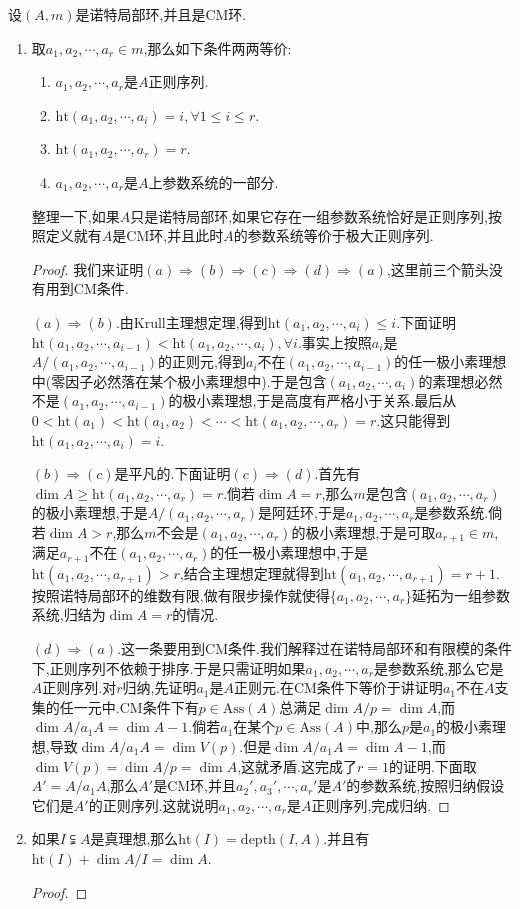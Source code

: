 设$(A,m)$是诺特局部环,并且是CM环.
\begin{enumerate}
	\item 取$a_1,a_2,\cdots,a_r\in m$,那么如下条件两两等价:
	\begin{enumerate}
		\item $a_1,a_2,\cdots,a_r$是$A$正则序列.
		\item $\mathrm{ht}(a_1,a_2,\cdots,a_i)=i,\forall 1\le i\le r$.
		\item $\mathrm{ht}(a_1,a_2,\cdots,a_r)=r$.
		\item $a_1,a_2,\cdots,a_r$是$A$上参数系统的一部分.
	\end{enumerate}

    整理一下,如果$A$只是诺特局部环,如果它存在一组参数系统恰好是正则序列,按照定义就有$A$是CM环,并且此时$A$的参数系统等价于极大正则序列.
	\begin{proof}
		
		我们来证明$(a)\Rightarrow(b)\Rightarrow(c)\Rightarrow(d)\Rightarrow(a)$,这里前三个箭头没有用到CM条件.
		
		$(a)\Rightarrow(b)$.由Krull主理想定理,得到$\mathrm{ht}(a_1,a_2,\cdots,a_i)\le i$.下面证明$\mathrm{ht}(a_1,a_2,\cdots,a_{i-1})<\mathrm{ht}(a_1,a_2,\cdots,a_i),\forall i$.事实上按照$a_i$是$A/(a_1,a_2,\cdots,a_{i-1})$的正则元,得到$a_i$不在$(a_1,a_2,\cdots,a_{i-1})$的任一极小素理想中(零因子必然落在某个极小素理想中).于是包含$(a_1,a_2,\cdots,a_i)$的素理想必然不是$(a_1,a_2,\cdots,a_{i-1})$的极小素理想,于是高度有严格小于关系.最后从$0<\mathrm{ht}(a_1)<\mathrm{ht}(a_1,a_2)<\cdots<\mathrm{ht}(a_1,a_2,\cdots,a_r)=r$.这只能得到$\mathrm{ht}(a_1,a_2,\cdots,a_i)=i$.
		
		$(b)\Rightarrow(c)$是平凡的.下面证明$(c)\Rightarrow(d)$.首先有$\dim A\ge\mathrm{ht}(a_1,a_2,\cdots,a_r)=r$.倘若$\dim A=r$,那么$m$是包含$(a_1,a_2,\cdots,a_r)$的极小素理想,于是$A/(a_1,a_2,\cdots,a_r)$是阿廷环,于是$a_1,a_2,\cdots,a_r$是参数系统.倘若$\dim A>r$,那么$m$不会是$(a_1,a_2,\cdots,a_r)$的极小素理想,于是可取$a_{r+1}\in m$,满足$a_{r+1}$不在$(a_1,a_2,\cdots,a_r)$的任一极小素理想中,于是$\mathrm{ht}(a_1,a_2,\cdots,a_{r+1})>r$,结合主理想定理就得到$\mathrm{ht}(a_1,a_2,\cdots,a_{r+1})=r+1$.按照诺特局部环的维数有限,做有限步操作就使得$\{a_1,a_2,\cdots,a_r\}$延拓为一组参数系统,归结为$\dim A=r$的情况.
		
		$(d)\Rightarrow(a)$.这一条要用到CM条件.我们解释过在诺特局部环和有限模的条件下,正则序列不依赖于排序.于是只需证明如果$a_1,a_2,\cdots,a_r$是参数系统,那么它是$A$正则序列.对$r$归纳,先证明$a_1$是$A$正则元.在CM条件下等价于讲证明$a_1$不在$A$支集的任一元中.CM条件下有$p\in\mathrm{Ass}(A)$总满足$\dim A/p=\dim A$,而$\dim A/a_1A=\dim A-1$.倘若$a_1$在某个$p\in\mathrm{Ass}(A)$中,那么$p$是$a_1$的极小素理想,导致$\dim A/a_1A=\dim V(p)$.但是$\dim A/a_1A=\dim A-1$,而$\dim V(p)=\dim A/p=\dim A$,这就矛盾.这完成了$r=1$的证明.下面取$A'=A/a_1A$,那么$A'$是CM环,并且$a_2',a_3',\cdots,a_r'$是$A'$的参数系统,按照归纳假设它们是$A'$的正则序列.这就说明$a_1,a_2,\cdots,a_r$是$A$正则序列,完成归纳.
	\end{proof}
	\item 如果$I\subsetneqq A$是真理想,那么$\mathrm{ht}(I)=\mathrm{depth}(I,A)$.并且有$\mathrm{ht}(I)+\dim A/I=\dim A$.
	\begin{proof}
		

\end{proof}
\end{enumerate}
